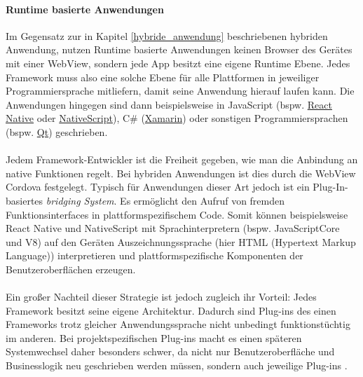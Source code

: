 \paragraph{Runtime basierte Anwendungen}
\label{runtime_based_apps}
Im Gegensatz zur in Kapitel \ref{hybride_anwendung} beschriebenen hybriden Anwendung, nutzen Runtime basierte Anwendungen keinen Browser des Gerätes mit einer WebView, sondern jede App besitzt eine eigene Runtime Ebene. 
Jedes Framework muss also eine solche Ebene für alle Plattformen in jeweiliger Programmiersprache mitliefern, damit seine Anwendung hierauf laufen kann.
Die Anwendungen hingegen sind dann beispielsweise in JavaScript (bspw. \href{https://reactnative.dev/}{React Native} oder \href{https://nativescript.org/}{NativeScript}), C\# (\href{https://dotnet.microsoft.com/apps/xamarin}{Xamarin}) oder sonstigen Programmiersprachen (bspw. \href{https://www.qt.io/}{Qt}) geschrieben.\\
\\
Jedem Framework-Entwickler ist die Freiheit gegeben, wie man die Anbindung an native Funktionen regelt. Bei hybriden Anwendungen ist dies durch die WebView Cordova festgelegt.
Typisch für Anwendungen dieser Art jedoch ist ein Plug-In-basiertes \textit{bridging System}. Es ermöglicht den Aufruf von fremden Funktionsinterfaces in plattformspezifischem Code.
Somit können beispielsweise React Native und NativeScript mit Sprachinterpretern (bspw. JavaScriptCore und V8) auf den Geräten Auszeichnungssprache (hier HTML (Hypertext Markup Language)) interpretieren und plattformspezifische Komponenten der Benutzeroberflächen erzeugen.\\
\\
Ein großer Nachteil dieser Strategie ist jedoch zugleich ihr Vorteil: Jedes Framework besitzt seine eigene Architektur. Dadurch sind Plug-ins des einen Frameworks trotz gleicher Anwendungssprache nicht unbedingt funktionstüchtig im anderen. 
Bei projektspezifischen Plug-ins macht es einen späteren Systemwechsel daher besonders schwer, da nicht nur Benutzeroberfläche und Businesslogik neu geschrieben werden müssen, sondern auch jeweilige Plug-ins \cite{bjorn-hansen2020}.

